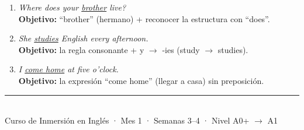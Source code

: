\documentclass[12pt,a4paper]{article}
\begin{document}
\begin{cajamineria}
\begin{enumerate}[leftmargin=1.2cm]
  \item \textit{Where does your \underline{brother} live?}\\
    {\small\textbf{Objetivo:} ``brother'' (hermano) + reconocer la estructura con ``does''.}

  \item \textit{She \underline{studies} English every afternoon.}\\
    {\small\textbf{Objetivo:} la regla consonante + y $\rightarrow$ -ies (study $\rightarrow$ studies).}

  \item \textit{I \underline{come home} at five o'clock.}\\
    {\small\textbf{Objetivo:} la expresión ``come home'' (llegar a casa) sin preposición.}
\end{enumerate}
\end{cajamineria}

\vfill
\begin{center}
\rule{0.5\textwidth}{0.5pt}\\[0.3cm]
{\small\color{grissuave} Curso de Inmersión en Inglés · Mes 1 · Semanas 3--4 · Nivel A0+ $\rightarrow$ A1}
\end{center}
\end{document}
